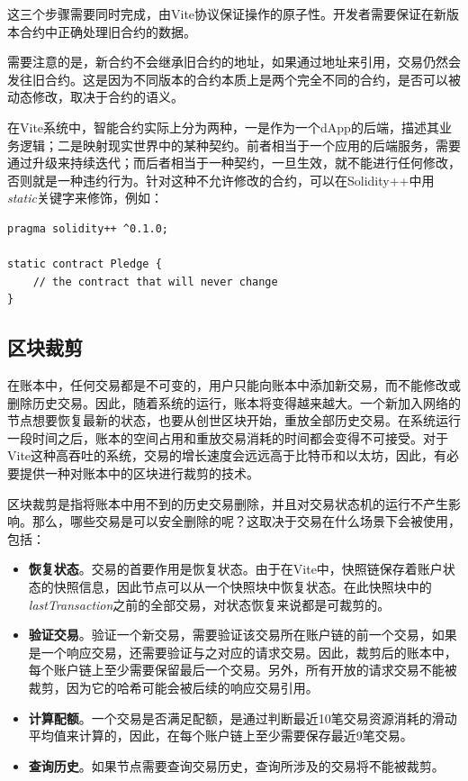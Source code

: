 \documentclass[UTF8,nofonts]{ctexart}
\begin{document}
\begin{multicols}{2}
这三个步骤需要同时完成，由Vite协议保证操作的原子性。开发者需要保证在新版本合约中正确处理旧合约的数据。

需要注意的是，新合约不会继承旧合约的地址，如果通过地址来引用，交易仍然会发往旧合约。这是因为不同版本的合约本质上是两个完全不同的合约，是否可以被动态修改，取决于合约的语义。

在Vite系统中，智能合约实际上分为两种，一是作为一个dApp的后端，描述其业务逻辑；二是映射现实世界中的某种契约。前者相当于一个应用的后端服务，需要通过升级来持续迭代；而后者相当于一种契约，一旦生效，就不能进行任何修改，否则就是一种违约行为。针对这种不允许修改的合约，可以在Solidity++中用\textit{static}关键字来修饰，例如：
\begin{verbatim}
pragma solidity++ ^0.1.0;

static contract Pledge {
    // the contract that will never change
}
\end{verbatim}

\subsection{区块裁剪}
在账本中，任何交易都是不可变的，用户只能向账本中添加新交易，而不能修改或删除历史交易。因此，随着系统的运行，账本将变得越来越大。一个新加入网络的节点想要恢复最新的状态，也要从创世区块开始，重放全部历史交易。在系统运行一段时间之后，账本的空间占用和重放交易消耗的时间都会变得不可接受。对于Vite这种高吞吐的系统，交易的增长速度会远远高于比特币和以太坊，因此，有必要提供一种对账本中的区块进行裁剪的技术。

区块裁剪是指将账本中用不到的历史交易删除，并且对交易状态机的运行不产生影响。那么，哪些交易是可以安全删除的呢？这取决于交易在什么场景下会被使用，包括：

\begin{itemize}
\item \textbf{恢复状态}。交易的首要作用是恢复状态。由于在Vite中，快照链保存着账户状态的快照信息，因此节点可以从一个快照块中恢复状态。在此快照块中的\textit{lastTransaction}之前的全部交易，对状态恢复来说都是可裁剪的。
\item \textbf{验证交易}。验证一个新交易，需要验证该交易所在账户链的前一个交易，如果是一个响应交易，还需要验证与之对应的请求交易。因此，裁剪后的账本中，每个账户链上至少需要保留最后一个交易。另外，所有开放的请求交易不能被裁剪，因为它的哈希可能会被后续的响应交易引用。
\item \textbf{计算配额}。一个交易是否满足配额，是通过判断最近10笔交易资源消耗的滑动平均值来计算的，因此，在每个账户链上至少需要保存最近9笔交易。
\item \textbf{查询历史}。如果节点需要查询交易历史，查询所涉及的交易将不能被裁剪。
\end{itemize}


\end{multicols}
\end{document}
